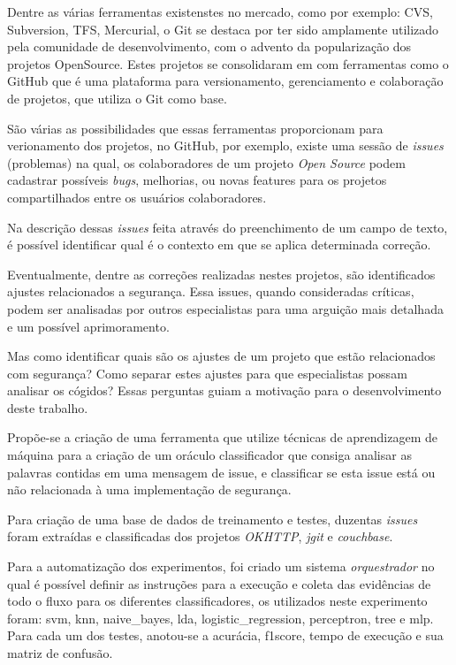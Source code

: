 \documentclass[conference]{IEEEtran}
\begin{document}
Dentre as várias ferramentas existenstes no mercado, como por exemplo: CVS, Subversion, TFS, Mercurial, o Git se destaca por ter sido amplamente utilizado pela comunidade de desenvolvimento, com o advento da popularização dos projetos OpenSource. Estes projetos se consolidaram em com ferramentas como o GitHub que é uma plataforma para versionamento, gerenciamento e colaboração de projetos, que utiliza o Git como base.

São várias as possibilidades que essas ferramentas proporcionam para verionamento dos projetos, no GitHub, por exemplo, existe uma sessão de \textit{issues} (problemas) na qual, os colaboradores de um projeto \textit{Open Source} podem cadastrar possíveis \textit{bugs}, melhorias, ou novas features para os projetos compartilhados entre os usuários colaboradores.

Na descrição dessas \textit{issues} feita através do preenchimento de um campo de texto, é possível identificar qual é o contexto em que se aplica determinada correção.

Eventualmente, dentre as correções realizadas nestes projetos, são identificados ajustes relacionados a segurança. Essa issues, quando consideradas críticas, podem ser analisadas por outros especialistas para uma arguição mais detalhada e um possível aprimoramento.

Mas como identificar quais são os ajustes de um projeto que estão relacionados com segurança? Como separar estes ajustes para que especialistas possam analisar os cógidos? Essas perguntas guiam a motivação para o desenvolvimento deste trabalho.

Propõe-se a criação de uma ferramenta que utilize técnicas de aprendizagem de máquina para a criação de um oráculo classificador que consiga analisar as palavras contidas em uma mensagem de issue, e classificar se esta issue está ou não relacionada à uma implementação de segurança.

Para criação de uma base de dados de treinamento e testes, duzentas \textit{issues} foram extraídas e classificadas dos projetos \textit{OKHTTP}, \textit{jgit} e \textit{couchbase}.

Para a automatização dos experimentos, foi criado um sistema \textit{orquestrador} no qual é possível definir as instruções para a execução e coleta das evidências de todo o fluxo para os diferentes classificadores, os utilizados neste experimento foram: svm, knn, naive\_bayes, lda, logistic\_regression, perceptron, tree e mlp. Para cada um dos testes, anotou-se a acurácia, f1score, tempo de execução e sua matriz de confusão.
\end{document}
